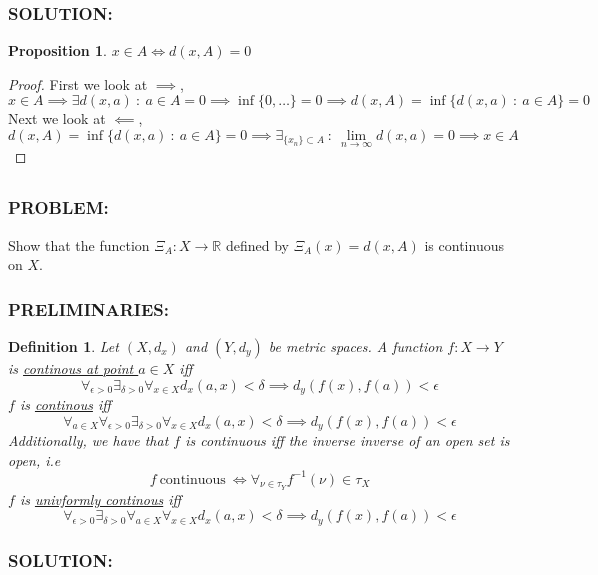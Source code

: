 \documentclass[]{article}
\newcommand{\Problem}{\subsubsection*{\textbf{PROBLEM:}}}
\newcommand{\Solution}{\subsubsection*{\textbf{SOLUTION:}}}
\newcommand{\Preliminaries}{\subsubsection*{\textbf{PRELIMINARIES:}}}
\newcommand{\R}{\mathbb{R}}
\newcommand{\st}{\ : \ }
\newtheorem{definition}{Definition}
\newtheorem{proposition}{Proposition}
\begin{document}
\Solution
\begin{proposition}
    $x \in A \iff d(x,A) = 0$
\end{proposition}
\begin{proof}
    First we look at $\implies$,\[
        x \in A \implies \exists d(x,a) \st a \in A = 0 \implies \inf\{0,\dots\} = 0 \implies d(x,A) = \inf\{d(x,a) \st a \in A\} = 0
    \] Next we look at $\impliedby$, \[
        d(x,A) = \inf\{d(x,a) \st a \in A\} = 0 \implies \exists_{\{x_n\} \subset A} \st \lim_{n\to \infty} d(x,a) = 0 \implies x \in A
    \]
\end{proof}

\subsection{}
\Problem
Show that the function $\Xi_A : X \to \R$ defined by $\Xi_A(x) = d(x,A)$ is continuous on $X$.

\Preliminaries
\begin{definition}
    Let $(X, d_x)$ and $(Y, d_y)$ be metric spaces.
    A function $f : X \to Y$ is \emph{\underline{continous at point $a \in X$}} iff \[
        \forall_{\epsilon>0} \exists_{\delta > 0} \forall_{x \in X} d_x(a,x) < \delta \implies d_y(f(x),f(a)) < \epsilon
    \] $f$ is \emph{\underline{continous}} iff \[
        \forall_{a \in X} \forall_{\epsilon>0} \exists_{\delta > 0} \forall_{x \in X} d_x(a,x) < \delta \implies d_y(f(x),f(a)) < \epsilon
    \] Additionally, we have that $f$ is continuous iff the inverse inverse of an open set is open, i.e \[
        f \ \text{continuous} \ \iff \forall_{\nu \in \tau_Y} f^{-1} (\nu) \in \tau_X
    \] $f$ is \emph{\underline{univformly continous}} iff \[
        \forall_{\epsilon>0} \exists_{\delta > 0} \forall_{a \in X} \forall_{x \in X} d_x(a,x) < \delta \implies d_y(f(x),f(a)) < \epsilon
    \]
\end{definition}

\Solution
\end{document}

